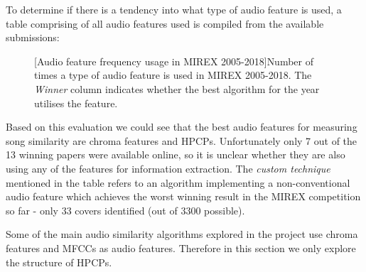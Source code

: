 To determine if there is a tendency into what type of audio feature is used, a
table comprising of all audio features used is compiled from the available
submissions:
\begin{figure}[H]
    \centering
    [Audio feature frequency usage in MIREX 2005-2018]{Number of times a type of audio feature is used in MIREX 2005-2018. The \textit{Winner} column indicates whether the best algorithm for the year utilises the feature.}
\end{figure}

Based on this evaluation we could see that the best audio features for measuring
song similarity are chroma features and HPCPs. Unfortunately only 7 out of the
13 winning papers were available online, so it is unclear whether they are also
using any of the features for information extraction. The \textit{custom
technique} mentioned in the table refers to an algorithm implementing a
non-conventional audio feature which achieves the worst winning result in the
MIREX competition so far  -  only  33 covers  identified (out  of  3300
possible).

Some of the main audio similarity algorithms explored in the project use chroma
features and MFCCs as audio features. Therefore in this section we only explore
the structure of HPCPs.

